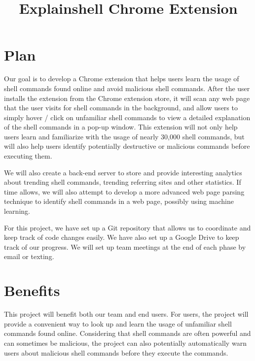 \documentclass[11pt]{article}
\title{Explainshell Chrome Extension \\ \vspace*{.5em} \Large\mytitle}
\date{}
\newcommand{\myname}{Your name here}
\begin{document}
\clearpage\maketitle
\thispagestyle{firststyle}
\newpage
{}  
\lhead{\myname}
\rhead{\thepage}
\setlength{\voffset}{-50pt}
\setlength{\headsep}{25pt}

\section{Plan}

Our goal is to develop a Chrome extension that helps users learn the usage of shell commands found online and avoid malicious shell commands. After the user installs the extension from the Chrome extension store, it will scan any web page that the user visits for shell commands in the background, and allow users to simply hover / click on unfamiliar shell commands to view a detailed explanation of the shell commands in a pop-up window. This extension will not only help users learn and familiarize with the usage of nearly 30,000 shell commands, but will also help users identify potentially destructive or malicious commands before executing them. 

We will also create a back-end server to store and provide interesting analytics about trending shell commands, trending referring sites and other statistics. If time allows, we will also attempt to develop a more advanced web page parsing technique to identify shell commands in a web page, possibly using machine learning.

For this project, we have set up a Git repository that allows us to coordinate and keep track of code changes easily. We have also set up a Google Drive to keep track of our progress. We will set up team meetings at the end of each phase by email or texting.

\section{Benefits}

This project will benefit both our team and end users. For users, the project will provide a convenient way to look up and learn the usage of unfamiliar shell commands found online. Considering that shell commands are often powerful and can sometimes be malicious, the project can also potentially automatically warn users about malicious shell commands before they execute the commands. 
\end{document}
